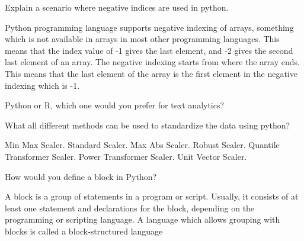 	\begin{qanda}
		\begin{question}
Explain a scenario where negative indices are used in python.
		\end{question}
		\begin{answer}
Python programming language supports negative indexing of arrays, something which is not available in arrays in most other programming languages. This means that the index value of -1 gives the last element, and -2 gives the second last element of an array. The negative indexing starts from where the array ends. This means that the last element of the array is the first element in the negative indexing which is -1.
		\end{answer}
	\end{qanda}

	\begin{qanda}
		\begin{question}
Python or R, which one would you prefer for text analytics?
		\end{question}
		\begin{answer}

		\end{answer}
	\end{qanda}

	\begin{qanda}
		\begin{question}
What all different methods can be used to standardize the data using python?
		\end{question}
		\begin{answer}
Min Max Scaler.  Standard Scaler.  Max Abs Scaler. Robust Scaler.  Quantile Transformer Scaler.  Power Transformer Scaler.  Unit Vector Scaler.
		\end{answer}
	\end{qanda}

	\begin{qanda}
		\begin{question}
How would you define a block in Python?
		\end{question}
		\begin{answer}
A block is a group of statements in a program or script.  Usually, it consists of at least one statement and declarations for the block, depending on the programming or scripting language.  A language which allows grouping with blocks is called a block-structured language
		\end{answer}
	\end{qanda}

